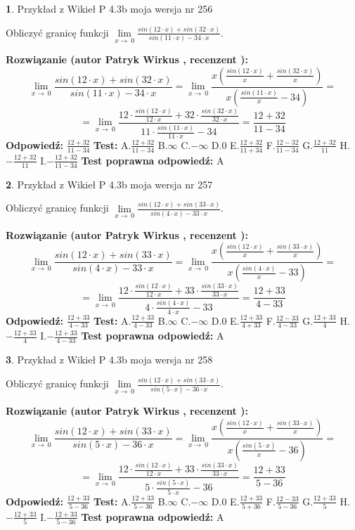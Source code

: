 \documentclass[12pt, a4paper]{article}
\theoremstyle{definition} %
\newtheorem{zad}{}
\newcommand{\zadStart}[1]{\begin{zad}#1\newline}
\newcommand{\zadStop}{\end{zad}}
\newcommand{\rozwStart}[2]{\noindent \textbf{Rozwiązanie (autor #1 , recenzent #2): }\newline}
\newcommand{\rozwStop}{\newline}
\newcommand{\odpStart}{\noindent \textbf{Odpowiedź:}\newline}
\newcommand{\odpStop}{\newline}
\newcommand{\testStart}{\noindent \textbf{Test:}\newline}
\newcommand{\testStop}{\newline}
\newcommand{\kluczStart}{\noindent \textbf{Test poprawna odpowiedź:}\newline}
\newcommand{\kluczStop}{\newline}
\begin{document}
\zadStart{Przykład z Wikieł P 4.3b moja wersja nr 256}


Obliczyć granicę funkcji $\lim\limits_{x\to\ 0}\frac{sin(12 \cdot x)+sin(32 \cdot x)}{sin(11 \cdot x)-34 \cdot x}$.
\zadStop
\rozwStart{Patryk Wirkus}{}
$$\lim\limits_{x\to\ 0}\frac{sin(12 \cdot x)+sin(32 \cdot x)}{sin(11 \cdot x)-34 \cdot x}=\lim\limits_{x\to\ 0}\frac{x(\frac{sin(12 \cdot x)}{x}+\frac{sin(32 \cdot x)}{x})}{x(\frac{sin(11 \cdot x)}{x}-34)}=$$
$$=\lim\limits_{x\to\ 0}\frac{12 \cdot \frac{sin(12 \cdot x)}{12 \cdot x}+32 \cdot \frac{sin(32 \cdot x)}{32 \cdot x}}{11 \cdot \frac{sin(11 \cdot x)}{11 \cdot x}-34}=\frac{12+32}{11-34}$$
\rozwStop
\odpStart
$\frac{12+32}{11-34}$
\odpStop
\testStart
A.$\frac{12+32}{11-34}$
B.$\infty$
C.$-\infty$
D.$0$
E.$\frac{12+32}{11+34}$
F.$\frac{12-32}{11-34}$
G.$\frac{12+32}{11}$
H.$-\frac{12+32}{11}$
I.$-\frac{12+32}{11-34}$
\testStop
\kluczStart
A
\kluczStop



\zadStart{Przykład z Wikieł P 4.3b moja wersja nr 257}


Obliczyć granicę funkcji $\lim\limits_{x\to\ 0}\frac{sin(12 \cdot x)+sin(33 \cdot x)}{sin(4 \cdot x)-33 \cdot x}$.
\zadStop
\rozwStart{Patryk Wirkus}{}
$$\lim\limits_{x\to\ 0}\frac{sin(12 \cdot x)+sin(33 \cdot x)}{sin(4 \cdot x)-33 \cdot x}=\lim\limits_{x\to\ 0}\frac{x(\frac{sin(12 \cdot x)}{x}+\frac{sin(33 \cdot x)}{x})}{x(\frac{sin(4 \cdot x)}{x}-33)}=$$
$$=\lim\limits_{x\to\ 0}\frac{12 \cdot \frac{sin(12 \cdot x)}{12 \cdot x}+33 \cdot \frac{sin(33 \cdot x)}{33 \cdot x}}{4 \cdot \frac{sin(4 \cdot x)}{4 \cdot x}-33}=\frac{12+33}{4-33}$$
\rozwStop
\odpStart
$\frac{12+33}{4-33}$
\odpStop
\testStart
A.$\frac{12+33}{4-33}$
B.$\infty$
C.$-\infty$
D.$0$
E.$\frac{12+33}{4+33}$
F.$\frac{12-33}{4-33}$
G.$\frac{12+33}{4}$
H.$-\frac{12+33}{4}$
I.$-\frac{12+33}{4-33}$
\testStop
\kluczStart
A
\kluczStop



\zadStart{Przykład z Wikieł P 4.3b moja wersja nr 258}


Obliczyć granicę funkcji $\lim\limits_{x\to\ 0}\frac{sin(12 \cdot x)+sin(33 \cdot x)}{sin(5 \cdot x)-36 \cdot x}$.
\zadStop
\rozwStart{Patryk Wirkus}{}
$$\lim\limits_{x\to\ 0}\frac{sin(12 \cdot x)+sin(33 \cdot x)}{sin(5 \cdot x)-36 \cdot x}=\lim\limits_{x\to\ 0}\frac{x(\frac{sin(12 \cdot x)}{x}+\frac{sin(33 \cdot x)}{x})}{x(\frac{sin(5 \cdot x)}{x}-36)}=$$
$$=\lim\limits_{x\to\ 0}\frac{12 \cdot \frac{sin(12 \cdot x)}{12 \cdot x}+33 \cdot \frac{sin(33 \cdot x)}{33 \cdot x}}{5 \cdot \frac{sin(5 \cdot x)}{5 \cdot x}-36}=\frac{12+33}{5-36}$$
\rozwStop
\odpStart
$\frac{12+33}{5-36}$
\odpStop
\testStart
A.$\frac{12+33}{5-36}$
B.$\infty$
C.$-\infty$
D.$0$
E.$\frac{12+33}{5+36}$
F.$\frac{12-33}{5-36}$
G.$\frac{12+33}{5}$
H.$-\frac{12+33}{5}$
I.$-\frac{12+33}{5-36}$
\testStop
\kluczStart
A
\kluczStop
\end{document}
